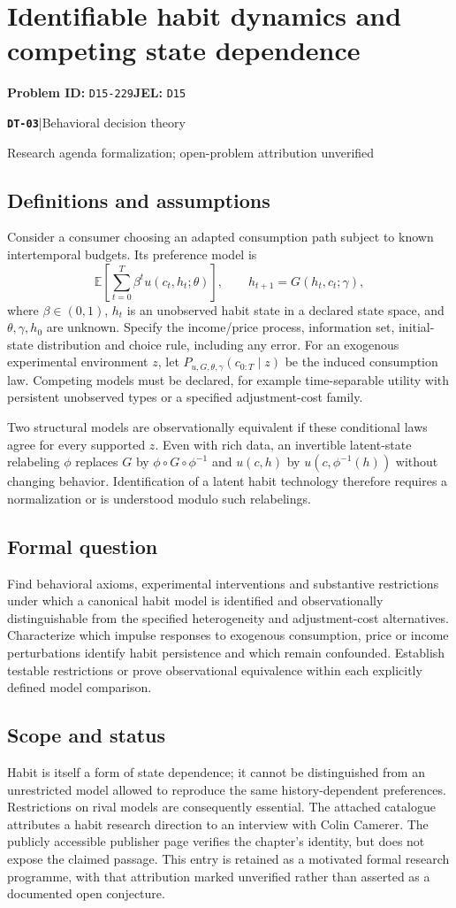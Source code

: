 \documentclass[11pt,a4paper]{article}
\newcommand{\E}{\mathbb E}
\newcommand{\entrymeta}[3]{{\sffamily\small\color{muted}\textbf{\texttt{#1}}\quad|\quad #2\par #3\par}}
\begin{document}
\section*{Identifiable habit dynamics and competing state dependence}
\textbf{Problem ID:} \texttt{D15-229}\quad \textbf{JEL:} \texttt{D15}\par
\label{problem:OP-0588}
\label{beyond:DT-03}
\entrymeta{DT-03}{Behavioral decision theory}{Research agenda formalization; open-problem attribution unverified}
\subsection*{Definitions and assumptions}
Consider a consumer choosing an adapted consumption path subject to known intertemporal budgets. Its preference model is
\[
 \E\left[\sum_{t=0}^{T}\beta^tu(c_t,h_t;\theta)\right],\qquad
 h_{t+1}=G(h_t,c_t;\gamma),
\]
where $\beta\in(0,1)$, $h_t$ is an unobserved habit state in a declared state space, and $\theta,\gamma,h_0$ are unknown. Specify the income/price process, information set, initial-state distribution and choice rule, including any error. For an exogenous experimental environment $z$, let $P_{u,G,\theta,\gamma}(c_{0:T}\mid z)$ be the induced consumption law. Competing models must be declared, for example time-separable utility with persistent unobserved types or a specified adjustment-cost family.

Two structural models are observationally equivalent if these conditional laws agree for every supported $z$. Even with rich data, an invertible latent-state relabeling $\phi$ replaces $G$ by $\phi\circ G\circ\phi^{-1}$ and $u(c,h)$ by $u(c,\phi^{-1}(h))$ without changing behavior. Identification of a latent habit technology therefore requires a normalization or is understood modulo such relabelings.
\subsection*{Formal question}
Find behavioral axioms, experimental interventions and substantive restrictions under which a canonical habit model is identified and observationally distinguishable from the specified heterogeneity and adjustment-cost alternatives. Characterize which impulse responses to exogenous consumption, price or income perturbations identify habit persistence and which remain confounded. Establish testable restrictions or prove observational equivalence within each explicitly defined model comparison.
\subsection*{Scope and status}
Habit is itself a form of state dependence; it cannot be distinguished from an unrestricted model allowed to reproduce the same history-dependent preferences. Restrictions on rival models are consequently essential. The attached catalogue attributes a habit research direction to an interview with Colin Camerer. The publicly accessible publisher page verifies the chapter's identity, but does not expose the claimed passage. This entry is retained as a motivated formal research programme, with that attribution marked unverified rather than asserted as a documented open conjecture.
\end{document}

